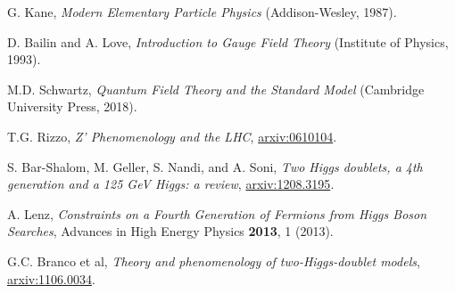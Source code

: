 \documentclass[a4paper,12pt]{article}
\begin{document}
\begin{thebibliography}{99}
G. Kane, \emph{Modern Elementary Particle Physics} (Addison-Wesley, 1987).

D. Bailin and A. Love, \emph{Introduction to Gauge Field Theory} (Institute of Physics, 1993).

M.D. Schwartz, \emph{Quantum Field Theory and the Standard Model} (Cambridge University Press, 2018).

T.G. Rizzo, \emph{Z' Phenomenology and the LHC}, \href{https://arxiv.org/pdf/hep-ph/0610104.pdf}{arxiv:0610104}.

S. Bar-Shalom, M. Geller, S. Nandi, and A. Soni, \emph{Two Higgs doublets, a 4th generation and a 125 GeV Higgs: a review}, \href{https://arxiv.org/pdf/1208.3195v2.pdf}{arxiv:1208.3195}.

A. Lenz, \emph{Constraints on a Fourth Generation of Fermions from Higgs Boson Searches}, Advances in High Energy Physics \textbf{2013}, 1 (2013).

G.C. Branco et al, \emph{Theory and phenomenology of two-Higgs-doublet models}, \href{https://arxiv.org/pdf/1106.0034.pdf}{arxiv:1106.0034}.




\end{thebibliography}
\end{document}
